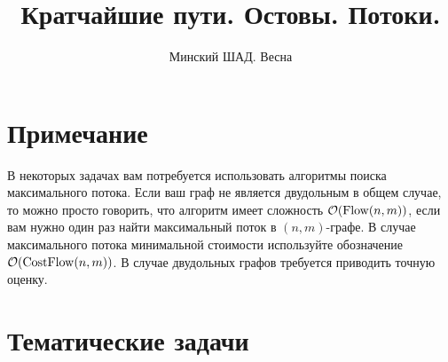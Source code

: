 \documentclass[addpoints]{exam}
\title{Кратчайшие пути. Остовы. Потоки.}
\author{Минский ШАД. Весна}
\DeclareMathOperator{\Flow}{Flow}
\DeclareMathOperator{\CostFlow}{CostFlow}
\begin{document}
\maketitle

\section{Примечание}

В некоторых задачах вам потребуется использовать алгоритмы поиска максимального потока. Если ваш граф не является двудольным в общем случае, то можно просто говорить, что алгоритм имеет сложность $\O{\Flow(n,m)}$, если вам нужно один раз найти максимальный поток в $(n,m)$-графе. В случае максимального потока минимальной стоимости используйте обозначение $\O{\CostFlow(n,m)}$. В случае двудольных графов требуется приводить точную оценку.

\section{Тематические задачи}
\end{document}
